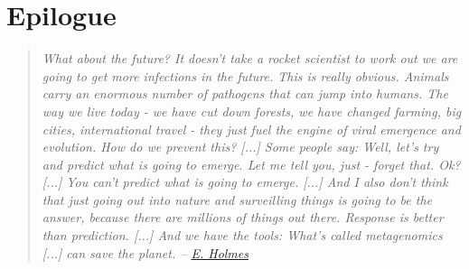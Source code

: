 \section{Epilogue}

\begin{quotation}
    \emph{What about the future? It doesn't take a rocket scientist to work out we are going to get more infections in the future. This is really obvious. Animals carry an enormous number of pathogens that can jump into humans. The way we live today - we have cut down forests, we have changed farming, big cities, international travel - they just fuel the engine of viral emergence and evolution. How do we prevent this? [...] Some people say: Well, let's try and predict what is going to emerge. Let me tell you, just - forget that. Ok? [...] You can't predict what is going to emerge. [...] And I also don't think that just going out into nature and surveilling things is going to be the answer, because there are millions of things out there. Response is better than prediction. [...] And we have the tools: What's called metagenomics [...] can save the planet. -- \hyperlink{https://www.youtube.com/watch?v=iK8ekVy_rmQ}{E. Holmes}}
\end{quotation}
